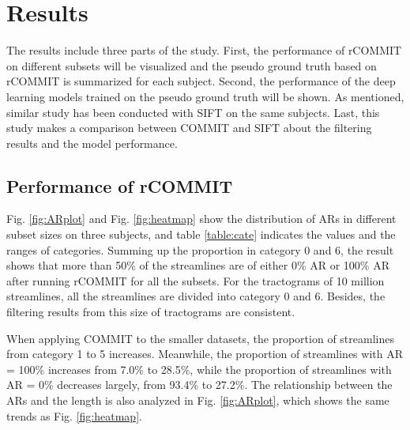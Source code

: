 \chapter{Results}

The results include three parts of the study. 
First, the performance of rCOMMIT on different subsets will be visualized and the pseudo ground truth based on 
rCOMMIT is summarized for each subject.
Second, the performance of the deep learning models trained on the pseudo ground truth will be shown. 
As mentioned, similar study has been conducted with SIFT \cite{smithSIFTSphericaldeconvolutionInformed2013} on the same subjects.
Last, this study makes a comparison between COMMIT and SIFT about the filtering results and the model performance. 

\section{Performance of rCOMMIT}

Fig. \ref{fig:ARplot} and Fig. \ref{fig:heatmap} show the distribution of ARs in different subset sizes on three subjects, 
and table \ref{table:cate} indicates the values and the ranges of categories. 
Summing up the proportion in category 0 and 6, the result shows that more than 50\% of the streamlines
are of either 0\% AR or 100\% AR after running rCOMMIT for all the subsets. For the tractograms of 10 million streamlines, all the streamlines
are divided into category 0 and 6. 
Besides, the filtering results from this size of tractograms are consistent.

When applying COMMIT to the smaller datasets, the proportion of streamlines from 
category 1 to 5 increases. Meanwhile, the proportion of streamlines with AR = 100\% increases from 7.0\% to 28.5\%,
while the proportion of streamlines with AR = 0\% decreases largely, from 93.4\% to 27.2\%.
The relationship between the ARs and the length is also analyzed in Fig. \ref{fig:ARplot}, which shows the same trends as Fig. \ref{fig:heatmap}.


